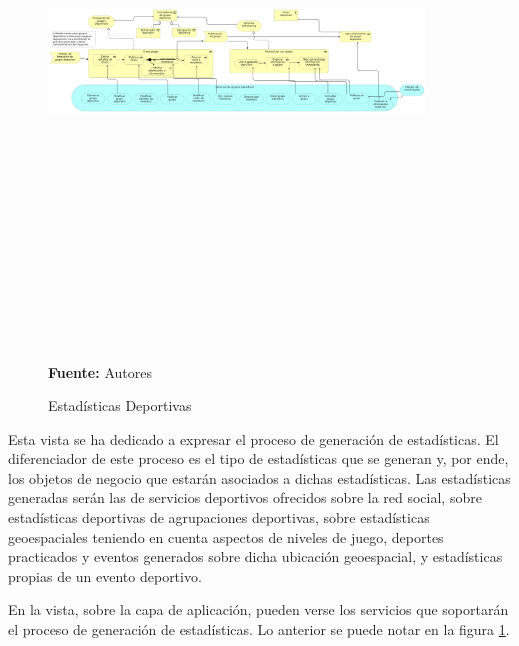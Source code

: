 \begin{figure}[!htb]
  \begin{center}
    \includegraphics[angle=90,width=10cm,height=15cm]{./imagenes/Archimate/vistas/business_process/estadisticasdeportivas.png}
    \caption{Estadísticas Deportivas}
    \label{fig:bp_estadisticas_deportivo}
    \textbf{Fuente:}  Autores \\
  \end{center}
\end{figure}

Esta vista se ha dedicado a expresar el proceso de generación de estadísticas. El diferenciador de este proceso es el tipo de estadísticas que se generan y, por ende, los objetos de negocio que estarán asociados a dichas estadísticas. Las estadísticas generadas serán las de servicios deportivos ofrecidos sobre la red social, sobre estadísticas deportivas de agrupaciones deportivas, sobre estadísticas geoespaciales teniendo en cuenta aspectos de niveles de juego, deportes practicados y eventos generados sobre dicha ubicación geoespacial, y estadísticas propias de un evento deportivo.

En la vista, sobre la capa de aplicación, pueden verse los servicios que soportarán el proceso de generación de estadísticas. Lo anterior se puede notar en la figura \ref{fig:bp_estadisticas_deportivo}.

